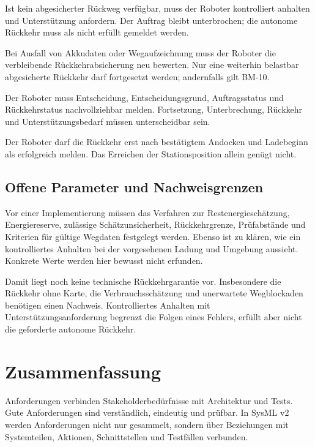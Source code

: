 \begin{description}[style=nextline]
    \item[BM-10: Keine abgesicherte Rückkehr] Ist kein abgesicherter Rückweg verfügbar, muss der Roboter kontrolliert anhalten und Unterstützung anfordern. Der Auftrag bleibt unterbrochen; die autonome Rückkehr muss als nicht erfüllt gemeldet werden.
    \item[BM-11: Datenausfall] Bei Ausfall von Akkudaten oder Wegaufzeichnung muss der Roboter die verbleibende Rückkehrabsicherung neu bewerten. Nur eine weiterhin belastbar abgesicherte Rückkehr darf fortgesetzt werden; andernfalls gilt BM-10.
    \item[BM-12: Nachvollziehbarer Status] Der Roboter muss Entscheidung, Entscheidungsgrund, Auftragsstatus und Rückkehrstatus nachvollziehbar melden. Fortsetzung, Unterbrechung, Rückkehr und Unterstützungsbedarf müssen unterscheidbar sein.
    \item[BM-13: Rückkehr erfolgreich] Der Roboter darf die Rückkehr erst nach bestätigtem Andocken und Ladebeginn als erfolgreich melden. Das Erreichen der Stationsposition allein genügt nicht.
\end{description}

\subsection{Offene Parameter und Nachweisgrenzen}
Vor einer Implementierung müssen das Verfahren zur Restenergieschätzung, Energiereserve, zulässige Schätzunsicherheit, Rückkehrgrenze, Prüfabstände und Kriterien für gültige Wegdaten festgelegt werden. Ebenso ist zu klären, wie ein kontrolliertes Anhalten bei der vorgesehenen Ladung und Umgebung aussieht. Konkrete Werte werden hier bewusst nicht erfunden.

Damit liegt noch keine technische Rückkehrgarantie vor. Insbesondere die Rückkehr ohne Karte, die Verbrauchsschätzung und unerwartete Wegblockaden benötigen einen Nachweis. Kontrolliertes Anhalten mit Unterstützungsanforderung begrenzt die Folgen eines Fehlers, erfüllt aber nicht die geforderte autonome Rückkehr.

\section{Zusammenfassung}
Anforderungen verbinden Stakeholderbedürfnisse mit Architektur und Tests. Gute Anforderungen sind verständlich, eindeutig und prüfbar. In SysML v2 werden Anforderungen nicht nur gesammelt, sondern über Beziehungen mit Systemteilen, Aktionen, Schnittstellen und Testfällen verbunden.

